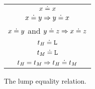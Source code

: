 \begin{figure}[p]
\caption{The lump equality relation.}
\centering
\begin{tabular}{c}

$x \doteq x$ \\
$x \doteq y \Rightarrow y \doteq x$ \\
$x \doteq y$ and $y \doteq z \Rightarrow x \doteq z$ \\
$t_{\mathit{H}} \doteq \mathtt{L}$ \\
$t_{\mathit{M}} \doteq \mathtt{L}$ \\
$t_{\mathit{H}} = t_{\mathit{M}} \Rightarrow t_{\mathit{H}} \doteq t_{\mathit{M}}$ \\

\end{tabular}
\label{figequality}
\end{figure}